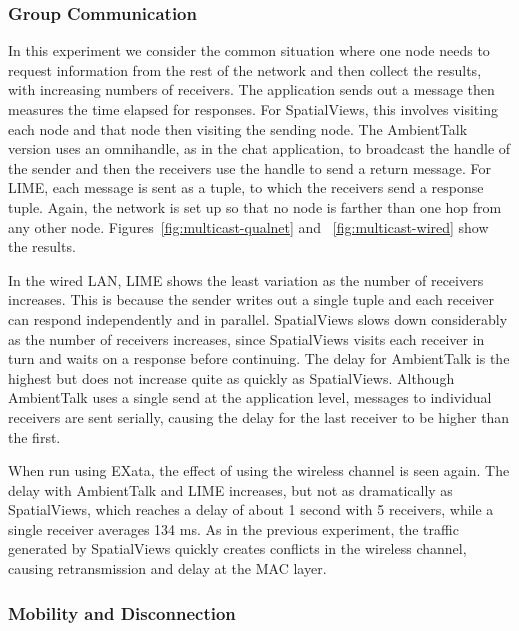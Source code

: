 \subsubsection{Group Communication}

In this experiment we consider the common situation where one node needs to request information from the rest of the network and then collect the results, with increasing numbers of receivers. The application sends out a message then measures the time elapsed for responses.  For SpatialViews, this involves visiting each node and that node then visiting the sending node. The AmbientTalk version uses an omnihandle, as in the chat application, to broadcast the handle of the sender and then the receivers use the handle to send a return message. For LIME, each message is sent as a tuple, to which the receivers send a response tuple. Again, the network is set up so that no node is farther than one hop from any other node. Figures~\ref{fig:multicast-qualnet} and ~\ref{fig:multicast-wired} show the results.

In the wired LAN, LIME shows the least variation as the number of receivers increases. This is because the sender writes out a single tuple and each receiver can respond independently and in parallel. SpatialViews slows down considerably as the number of receivers increases, since SpatialViews visits each receiver in turn and waits on a response before continuing. The delay for AmbientTalk is the highest but does not increase quite as quickly as SpatialViews. Although AmbientTalk uses a single send at the application level, messages to individual receivers are sent serially, causing the delay for the last receiver to be higher than the first. 

When run using EXata, the effect of using the wireless channel is seen again. The delay with AmbientTalk and LIME increases, but not as dramatically as SpatialViews, which reaches a delay of about 1 second with 5 receivers, while a single receiver averages 134 ms. As in the previous experiment, the traffic generated by SpatialViews quickly creates conflicts in the wireless channel, causing retransmission and delay at the MAC layer.

\subsubsection{Mobility and Disconnection}

